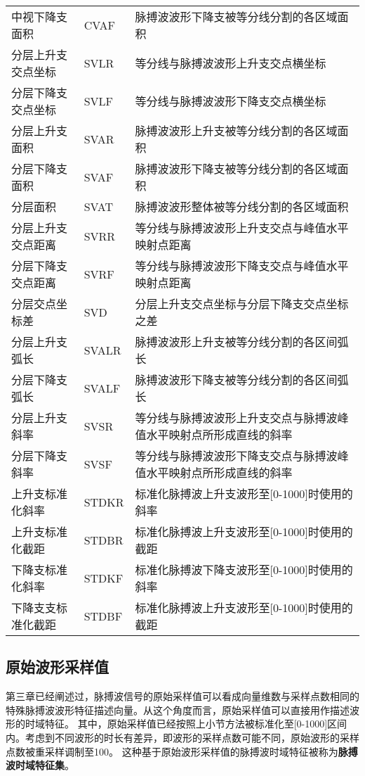 \begin{center}
\begin{longtable}{m{4cm}<{\centering}m{2cm}<{\centering}m{8.5cm}<{\centering}}
        中视下降支面积 & CVAF & 脉搏波波形下降支被等分线分割的各区域面积 \\
        分层上升支交点坐标 & SVLR & 等分线与脉搏波波形上升支交点横坐标 \\
        分层下降支交点坐标 & SVLF & 等分线与脉搏波波形下降支交点横坐标 \\
        分层上升支面积 & SVAR & 脉搏波波形上升支被等分线分割的各区域面积 \\
        分层下降支面积 & SVAF & 脉搏波波形下降支被等分线分割的各区域面积 \\
        分层面积 & SVAT & 脉搏波波形整体被等分线分割的各区域面积 \\
        分层上升支交点距离 & SVRR & 等分线与脉搏波波形上升支交点与峰值水平映射点距离 \\
        分层下降支交点距离 & SVRF & 等分线与脉搏波波形下降支交点与峰值水平映射点距离 \\
        分层交点坐标差 & SVD &  分层上升支交点坐标与分层下降支交点坐标之差\\
        分层上升支弧长 & SVALR & 脉搏波波形上升支被等分线分割的各区间弧长 \\
        分层下降支弧长 & SVALF & 脉搏波波形下降支被等分线分割的各区间弧长 \\
        分层上升支斜率 & SVSR & 等分线与脉搏波波形上升支交点与脉搏波峰值水平映射点所形成直线的斜率\\
        分层下降支斜率 & SVSF & 等分线与脉搏波波形下降支交点与脉搏波峰值水平映射点所形成直线的斜率 \\
        上升支标准化斜率 & STDKR & 标准化脉搏波上升支波形至[0-1000]时使用的斜率 \\
        上升支标准化截距 & STDBR & 标准化脉搏波上升支波形至[0-1000]时使用的截距 \\
        下降支标准化斜率& STDKF & 标准化脉搏波下降支波形至[0-1000]时使用的斜率 \\
        下降支支标准化截距 & STDBF & 标准化脉搏波上升支波形至[0-1000]时使用的截距 \\
  \end{longtable}
\end{center}

\subsection{原始波形采样值}

第三章已经阐述过，脉搏波信号的原始采样值可以看成向量维数与采样点数相同的特殊脉搏波波形特征描述向量。从这个角度而言，原始采样值可以直接用作描述波形的时域特征。
其中，原始采样值已经按照上小节方法被标准化至[0-1000]区间内。考虑到不同波形的时长有差异，即波形的采样点数可能不同，原始波形的采样点数被重采样调制至100。
这种基于原始波形采样值的脉搏波时域特征被称为\textbf{脉搏波时域特征集}。

